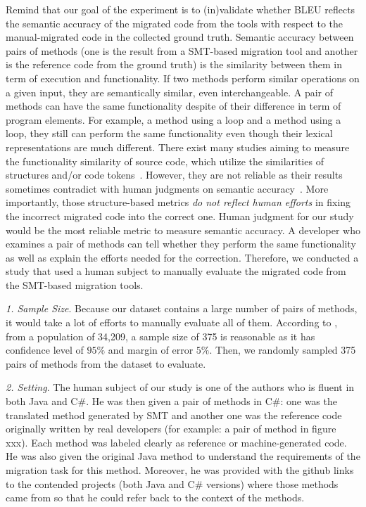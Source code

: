Remind that our goal of the experiment is to (in)validate whether BLEU
reflects the semantic accuracy of the migrated code from the tools
with respect to the manual-migrated code in the collected ground
truth. 
%
Semantic accuracy between pairs of methods (one is the result from a
SMT-based migration tool and another is the reference code from the
ground truth) is the similarity between them in term of execution and
functionality. If two methods perform similar operations on a given
input, they are semantically similar, even interchangeable. A pair of
methods can have the same functionality despite of their difference in
term of program elements.
%
For example, a method using a  loop and a method using a
 loop, they still can perform the same functionality even
though their lexical representations are much different. There exist
many studies aiming to measure the functionality similarity of source
code, which utilize the similarities of structures and/or code
tokens~\cite{tien}.
%
However, they are not reliable as their results sometimes contradict
with human judgments on semantic accuracy~\cite{fse14-higo}. More
importantly, those structure-based metrics {\em do not reflect human
  efforts} in fixing the incorrect migrated code into the correct one.
%
Human judgment for our study would be the most reliable metric to
measure semantic accuracy. A developer who examines a pair of methods
can tell whether they perform the same functionality as well as
explain the efforts needed for the correction. Therefore, we conducted
a study that used a human subject to manually evaluate the migrated
code from the SMT-based migration tools.


\emph{1. Sample Size}. Because our dataset contains a large number of pairs of methods, it would take a lot of efforts to manually evaluate all of them. According to \cite{website}, from a population of 34,209, a sample size of 375 is reasonable as it has confidence level of $95\%$ and margin of error $5\%$. Then, we randomly sampled 375 pairs of methods from the dataset to evaluate. 

\emph{2. Setting}. The human subject of our study is one of the authors who is fluent in both Java and C\#. He was then given a pair of methods in C\#: one was the translated method generated by SMT and another one was the reference code originally written by real developers (for example: a pair of method in figure xxx). Each method was labeled clearly as reference or machine-generated code. He was also given the original Java method to understand the requirements of the migration task for this method. Moreover, he was provided with the github links to the contended projects (both Java and C\# versions) where those methods came from so that he could refer back to the context of the methods.


